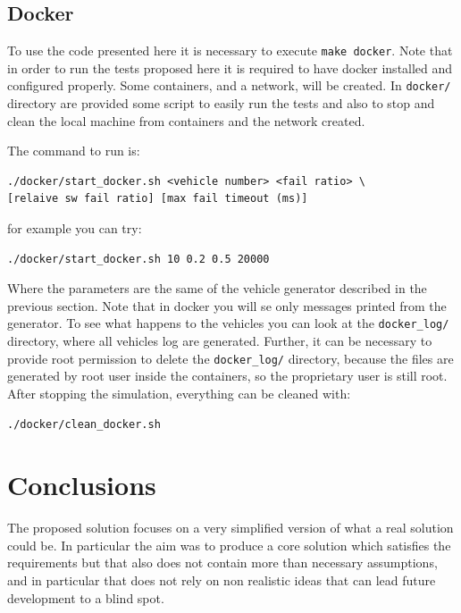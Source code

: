 \documentclass{memoir}
\begin{document}
\section{Docker}
To use the code presented here it is necessary to execute \texttt{make docker}. Note that in order to run the tests proposed here it is required to have docker installed and configured properly. Some containers, and a network, will be created. In \verb|docker/| directory are provided some script to easily run the tests and also to stop and clean the local machine from containers and the network created.

The command to run is:
\begin{verbatim}
./docker/start_docker.sh <vehicle number> <fail ratio> \
[relaive sw fail ratio] [max fail timeout (ms)]
\end{verbatim}
for example you can try:
\begin{verbatim}
./docker/start_docker.sh 10 0.2 0.5 20000
\end{verbatim}
Where the parameters are the same of the vehicle generator described in the previous section.
Note that in docker you will se only messages printed from the generator. To see what happens to the vehicles you can look at the \verb|docker_log/| directory, where all vehicles log are generated. Further, it can be necessary to provide root permission to delete the \verb|docker_log/| directory, because the files are generated by root user inside the containers, so the proprietary user is still root.
After stopping the simulation, everything can be cleaned with:
\begin{verbatim}
./docker/clean_docker.sh
\end{verbatim}

\chapter{Conclusions}
The proposed solution focuses on a very simplified version of what a real solution could be. In particular the aim was to produce a core solution which satisfies the requirements but that also does not contain more than necessary assumptions, and in particular that does not rely on non realistic ideas that can lead future development to a blind spot.
\end{document}
